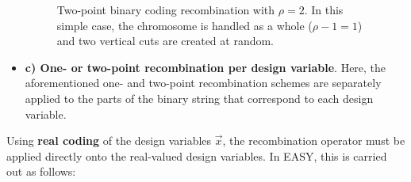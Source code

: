 \begin{itemize}
\begin{figure}[h!]
\begin{minipage}[b]{1.0\linewidth}
 \centering
\end{minipage}
\caption{Two-point binary coding recombination with $\rho=2$. In this simple case, the chromosome is handled as a whole ($\rho-1 = 1$) and two vertical cuts are created at random.} 
\label{2px}
\end{figure}

\FloatBarrier
\item[]{\bf c) One- or two-point recombination per design variable}. Here, the aforementioned one- and two-point recombination schemes are separately applied to the parts  of the binary string that correspond to each design variable.  
\end{itemize}
  
Using {\bf real coding} of the design variables $\vec{x}$, the recombination operator must be applied directly onto the real-valued design variables. In EASY, this is carried out as follows:  

